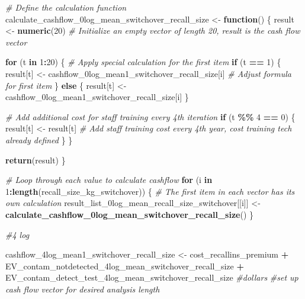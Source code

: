 \documentclass[
]{article}
\newenvironment{Shaded}{\begin{snugshade}}{\end{snugshade}}
\newcommand{\CommentTok}[1]{\textcolor[rgb]{0.56,0.35,0.01}{\textit{#1}}}
\newcommand{\ControlFlowTok}[1]{\textcolor[rgb]{0.13,0.29,0.53}{\textbf{#1}}}
\newcommand{\DecValTok}[1]{\textcolor[rgb]{0.00,0.00,0.81}{#1}}
\newcommand{\FunctionTok}[1]{\textcolor[rgb]{0.13,0.29,0.53}{\textbf{#1}}}
\newcommand{\NormalTok}[1]{#1}
\newcommand{\OtherTok}[1]{\textcolor[rgb]{0.56,0.35,0.01}{#1}}
\newcommand{\SpecialCharTok}[1]{\textcolor[rgb]{0.81,0.36,0.00}{\textbf{#1}}}
\begin{document}
\begin{Shaded}
\begin{Highlighting}[]
\CommentTok{\# Define the calculation function}
\NormalTok{calculate\_cashflow\_0log\_mean\_switchover\_recall\_size }\OtherTok{\textless{}{-}} \ControlFlowTok{function}\NormalTok{() \{}
\NormalTok{  result }\OtherTok{\textless{}{-}} \FunctionTok{numeric}\NormalTok{(}\DecValTok{20}\NormalTok{)  }\CommentTok{\# Initialize an empty vector of length 20, result is the cash flow vector}
  
  \ControlFlowTok{for}\NormalTok{ (t }\ControlFlowTok{in} \DecValTok{1}\SpecialCharTok{:}\DecValTok{20}\NormalTok{) \{}
    \CommentTok{\# Apply special calculation for the first item}
    \ControlFlowTok{if}\NormalTok{ (t }\SpecialCharTok{==} \DecValTok{1}\NormalTok{) \{}
\NormalTok{      result[t] }\OtherTok{\textless{}{-}}\NormalTok{ cashflow\_0log\_mean1\_switchover\_recall\_size[i] }\CommentTok{\# Adjust formula for first item}
\NormalTok{    \} }\ControlFlowTok{else}\NormalTok{ \{}
\NormalTok{      result[t] }\OtherTok{\textless{}{-}}\NormalTok{ cashflow\_0log\_mean1\_switchover\_recall\_size[i]}
\NormalTok{    \}}
    
    \CommentTok{\# Add additional cost for staff training every 4th iteration}
    \ControlFlowTok{if}\NormalTok{ (t }\SpecialCharTok{\%\%} \DecValTok{4} \SpecialCharTok{==} \DecValTok{0}\NormalTok{) \{}
\NormalTok{      result[t] }\OtherTok{\textless{}{-}}\NormalTok{ result[t]  }\CommentTok{\# Add staff training cost every 4th year, cost training tech already defined}
\NormalTok{    \}}
\NormalTok{  \}}
  
  \FunctionTok{return}\NormalTok{(result)}
\NormalTok{\}}

\CommentTok{\# Loop through each value to calculate cashflow}
\ControlFlowTok{for}\NormalTok{ (i }\ControlFlowTok{in} \DecValTok{1}\SpecialCharTok{:}\FunctionTok{length}\NormalTok{(recall\_size\_kg\_switchover)) \{}
  \CommentTok{\# The first item in each vector has its own calculation}
\NormalTok{  result\_list\_0log\_mean\_recall\_size\_switchover[[i]] }\OtherTok{\textless{}{-}} \FunctionTok{calculate\_cashflow\_0log\_mean\_switchover\_recall\_size}\NormalTok{()}
\NormalTok{\}}



\CommentTok{\#4 log}

\NormalTok{cashflow\_4log\_mean1\_switchover\_recall\_size }\OtherTok{\textless{}{-}}\NormalTok{ cost\_recallins\_premium }\SpecialCharTok{+}\NormalTok{ EV\_contam\_notdetected\_4log\_mean\_switchover\_recall\_size }\SpecialCharTok{+}\NormalTok{ EV\_contam\_detect\_test\_4log\_mean\_switchover\_recall\_size }\CommentTok{\#dollars}
\CommentTok{\#set up cash flow vector for desired analysis length}


\end{Highlighting}
\end{Shaded}
\end{document}
